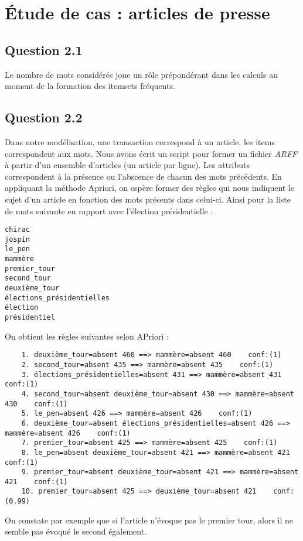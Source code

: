 \documentclass[a4paper,12pt]{article}
\begin{document}
\section{\'Etude de cas : articles de presse}

\subsection*{Question 2.1}

Le nombre de mots considérés joue un rôle prépondérant dans les calculs au moment de la formation des itemsets fréquents.


\subsection*{Question 2.2}

Dans notre modélisation, une transaction correspond à un article, les items correspondent aux mots.
Nous avons écrit un script pour former un fichier \textit{ARFF} à partir d'un ensemble d'articles (un article par ligne).
Les attributs correspondent à la présence ou l'abscence de chacun des mots précédents.
En appliquant la méthode Apriori, on espère former des règles qui nous indiquent le sujet d'un article en fonction des mots présents dans celui-ci.
Ainsi pour la liste de mots suivante en rapport avec l'élection présidentielle :
\begin{lstlisting}
chirac
jospin
le_pen
mammère
premier_tour
second_tour
deuxième_tour
élections_présidentielles
élection
présidentiel
\end{lstlisting}

On obtient les règles suivantes selon APriori :
\begin{lstlisting}
	1. deuxième_tour=absent 460 ==> mammère=absent 460    conf:(1)
	2. second_tour=absent 435 ==> mammère=absent 435    conf:(1)
	3. élections_présidentielles=absent 431 ==> mammère=absent 431    conf:(1)
	4. second_tour=absent deuxième_tour=absent 430 ==> mammère=absent 430    conf:(1)
	5. le_pen=absent 426 ==> mammère=absent 426    conf:(1)
	6. deuxième_tour=absent élections_présidentielles=absent 426 ==> mammère=absent 426    conf:(1)
	7. premier_tour=absent 425 ==> mammère=absent 425    conf:(1)
	8. le_pen=absent deuxième_tour=absent 421 ==> mammère=absent 421    conf:(1)
	9. premier_tour=absent deuxième_tour=absent 421 ==> mammère=absent 421    conf:(1)
	10. premier_tour=absent 425 ==> deuxième_tour=absent 421    conf:(0.99)
\end{lstlisting}

On constate par exemple que si l'article n'évoque pas le premier tour, alors il ne semble pas évoqué le second également.
\end{document}
